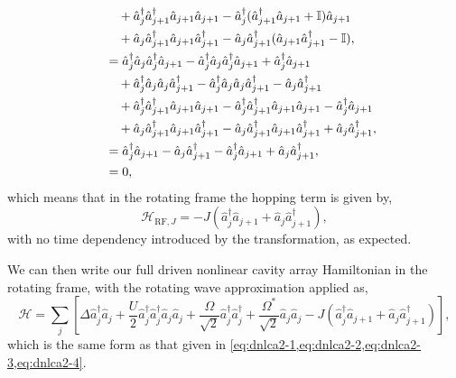 \begin{align}
	 &\qquad + \hat{a}_{j}^{\dagger}\hat{a}_{j+1}^{\dagger}\hat{a}_{j+1}\hat{a}_{j+1} - \hat{a}_{j}^{\dagger}(\hat{a}_{j+1}^{\dagger}\hat{a}_{j+1} + \mathbb{I})\hat{a}_{j+1} \notag \\ 
	 &\qquad + \hat{a}_{j}\hat{a}_{j+1}^{\dagger}\hat{a}_{j+1}\hat{a}_{j+1}^{\dagger} - \hat{a}_{j}\hat{a}_{j+1}^{\dagger}(\hat{a}_{j+1}\hat{a}_{j+1}^{\dagger} - \mathbb{I}), \notag \\
	 &\quad= \hat{a}_{j}^{\dagger}\hat{a}_{j}\hat{a}_{j}^{\dagger}\hat{a}_{j+1} - \hat{a}_{j}^{\dagger}\hat{a}_{j}\hat{a}_{j}^{\dagger}\hat{a}_{j+1} + \hat{a}_{j}^{\dagger}\hat{a}_{j+1} \notag \\
	 &\qquad + \hat{a}_{j}^{\dagger}\hat{a}_{j}\hat{a}_{j}\hat{a}_{j+1}^{\dagger} - \hat{a}_{j}^{\dagger}\hat{a}_{j}\hat{a}_{j}\hat{a}_{j+1}^{\dagger} - \hat{a}_{j}\hat{a}_{j+1}^{\dagger} \notag \\
	 &\qquad + \hat{a}_{j}^{\dagger}\hat{a}_{j+1}^{\dagger}\hat{a}_{j+1}\hat{a}_{j+1} - \hat{a}_{j}^{\dagger}\hat{a}_{j+1}^{\dagger}\hat{a}_{j+1}\hat{a}_{j+1} - \hat{a}_{j}^{\dagger}\hat{a}_{j+1} \notag \\ 
	 &\qquad + \hat{a}_{j}\hat{a}_{j+1}^{\dagger}\hat{a}_{j+1}\hat{a}_{j+1}^{\dagger} - \hat{a}_{j}\hat{a}_{j+1}^{\dagger}\hat{a}_{j+1}\hat{a}_{j+1}^{\dagger} + \hat{a}_{j}\hat{a}_{j+1}^{\dagger}, \notag \\
	 &\quad= \hat{a}_{j}^{\dagger}\hat{a}_{j+1} - \hat{a}_{j}\hat{a}_{j+1}^{\dagger} - \hat{a}_{j}^{\dagger}\hat{a}_{j+1} + \hat{a}_{j}\hat{a}_{j+1}^{\dagger}, \notag \\
	 &\quad= 0,
	\label{eq:rot27}
\end{align}
which means that in the rotating frame the hopping term is given by,
\begin{equation}
	\mathcal{H}_{\mathrm{RF},J} = -J\left(\hat{a}_{j}^{\dagger}\hat{a}_{j+1} + \hat{a}_{j}\hat{a}_{j+1}^{\dagger}\right),
	\label{eq:rot28}
\end{equation}
with no time dependency introduced by the transformation, as expected.

We can then write our full driven nonlinear cavity array Hamiltonian in the rotating frame, with the rotating wave approximation applied as,
\begin{equation}
	\mathcal{H} = \sum_{j}\left[\Delta\hat{a}_{j}^{\dagger}\hat{a}_{j} + \frac{U}{2}\hat{a}_{j}^{\dagger}\hat{a}_{j}^{\dagger}\hat{a}_{j}\hat{a}_{j} + \frac{\Omega}{\sqrt{2}}\hat{a}_{j}^{\dagger}\hat{a}_{j}^{\dagger} + \frac{\Omega^{*}}{\sqrt{2}}\hat{a}_{j}\hat{a}_{j} - J\left(\hat{a}_{j}^{\dagger}\hat{a}_{j+1} + \hat{a}_{j}\hat{a}_{j+1}^{\dagger}\right)\right],
	\label{eq:rot29}
\end{equation}
which is the same form as that given in \cref{eq:dnlca2-1,eq:dnlca2-2,eq:dnlca2-3,eq:dnlca2-4}.